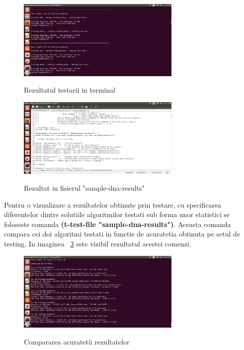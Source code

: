 \documentclass[a4paper,12pt]{report}
\begin{document}
\begin{figure}[h]
			\centering
			\caption{Rezultatul testarii in terminal}
			\label{fig:img2}
			\includegraphics[width=0.7\textwidth]{fig/img2}\\
\end{figure}

\begin{figure}[h]
			\centering
			\caption{Rezultat in fisierul "sample-dna-results"}
			\label{fig:img3}
			\includegraphics[width=0.7\textwidth]{fig/img3}\\
\end{figure}
	Pentru o vizualizare a rezultatelor obtinute prin testare, cu specificarea diferentelor dintre solutiile algoritmilor testati sub forma unor statistici se foloseste comanda \textbf{(t-test-file "sample-dna-results")}. Aceasta comanda compara cei doi algoritmi testati in functie de acuratetia obtinuta pe setul de testing. In imaginea ~\ref{fig:img4} este vizibil rezultatul acestei comenzi.
	
\begin{figure}[h]
			\centering
			\caption{Compararea acuratetii rezultatelor}
			\label{fig:img4}
			\includegraphics[width=0.7\textwidth]{fig/img4}\\
\end{figure}
\end{document}
